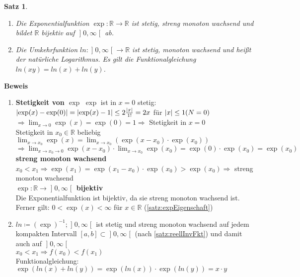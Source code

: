\documentclass[ngerman,titlepage,twoside, parskip=half*]{scrreprt}
\newcommand*{\R}{\mathbb{R}}
\theoremstyle{break}
\newtheorem{theorem}{Satz}[section]
\theoremstyle{nonumberbreak}
\DeclarePairedDelimiter{\abs}{\lvert}{\rvert}
\newcommand*{\bsofint}[1]{\mathopen{]}#1\mathclose{[}} %
\begin{document}
\begin{theorem}
\begin{enumerate}[i]
  \item Die Exponentialfunktion $\exp\colon \R\rightarrow\R$ ist stetig, streng monoton wach\-send und bildet $\R$ bijektiv auf
    $\bsofint{0,\infty}$ ab.
  \item Die Umkehrfunktion $ln\colon\bsofint{0,\infty}\rightarrow\R$ ist stetig, monoton wachsend und heißt der \emph{natürliche
    Logarithmus}. Es gilt die Funktionalgleichung $ln(xy)=ln(x)+ln(y)$.
\end{enumerate}
\end{theorem}

\textbf{Beweis}
\begin{enumerate}[zu i]
  \item \textbf{Stetigkeit von $\exp$} $\exp$ ist in $x=0$ stetig:\\
    $\abs{\exp(x)-\exp(0)}=\abs{\exp(x)-1}\leq 2\frac{\abs{x}}{1!}=2x$ für $\abs{x}\leq 1 (N=0)$\\
    $\Rightarrow \lim_{x\rightarrow 0}\exp(x)=\exp(0)=1\Rightarrow$ Stetigkeit in $x=0$\\
    Stetigkeit in $x_0\in \R$ beliebig\\
    $\lim_{x\rightarrow x_0} \exp(x)=\lim_{x\rightarrow x_0} (\exp(x-x_0)\cdot \exp(x_0))$\\
    $\Rightarrow \lim_{x\rightarrow x_0\rightarrow 0} \exp(x-x_0)\cdot \lim_{x\rightarrow x_0} \exp(x_0)=\exp(0)\cdot \exp(x_0)
    =\exp(x_0)$\\
    \textbf{streng monoton wachsend}\\
    $x_0<x_1 \Rightarrow \exp(x_1)=\exp(x_1-x_0)\cdot \exp(x_0)>\exp(x_0)\Rightarrow$ streng monoton wachsend\\
    \textbf{$\exp\colon\R\rightarrow \bsofint{0,\infty}$ bijektiv}\\
    Die Exponentialfunktion ist bijektiv, da sie streng monoton wachsend ist. Ferner gilt: $0<\exp(x)<\infty$ für $x\in\R$
    (\autoref{satz:expEigenschaft})
  \item $ln\coloneqq(\exp)^{-1}; \bsofint{0,\infty}$ ist stetig und streng monoton wachsend auf jedem kompakten Intervall $[a,b]\subset \bsofint{0,
    \infty}$ (nach \autoref{satz:reellInvFkt})
    und damit auch auf $\bsofint{0,\infty}$\\
    $x_0<x_1 \Rightarrow f(x_0)<f(x_1)$\\
    Funktionalgleichung:\\
    $\exp(ln (x)+ln(y))=\exp(ln(x))\cdot \exp(ln(y))=x\cdot y$
\end{enumerate}
\end{document}
